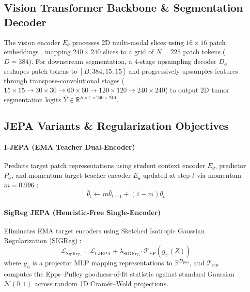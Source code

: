 \documentclass{article}
\begin{document}
\subsection{Vision Transformer Backbone \& Segmentation Decoder}
The vision encoder $E_\theta$ processes 2D multi-modal slices using $16 \times 16$ patch embeddings \citep{hatamizadeh2022swin}, mapping $240 \times 240$ slices to a grid of $N = 225$ patch tokens ($D = 384$). For downstream segmentation, a 4-stage upsampling decoder $D_\phi$ reshapes patch tokens to $[B, 384, 15, 15]$ and progressively upsamples features through transpose-convolutional stages ($15\times15 \rightarrow 30\times30 \rightarrow 60\times60 \rightarrow 120\times120 \rightarrow 240\times240$) to output 2D tumor segmentation logits $\hat{Y} \in \mathbb{R}^{B \times 1 \times 240 \times 240}$.

\subsection{JEPA Variants \& Regularization Objectives}

\paragraph{I-JEPA (EMA Teacher Dual-Encoder)}
Predicts target patch representations using student context encoder $E_\theta$, predictor $P_\phi$, and momentum target teacher encoder $E_{\bar{\theta}}$ updated at step $t$ via momentum $m = 0.996$ \citep{assran2023ijepa}:
\begin{equation}
    \bar{\theta}_t \leftarrow m \bar{\theta}_{t-1} + (1 - m) \theta_t
\end{equation}

\paragraph{SigReg JEPA (Heuristic-Free Single-Encoder)}
Eliminates EMA target encoders using Sketched Isotropic Gaussian Regularization (SIGReg) \citep{balestriero2025lejepa}:
\begin{equation}
    \mathcal{L}_{\text{SigReg}} = \mathcal{L}_{\text{I-JEPA}} + \lambda_{\text{SIGReg}} \cdot \mathcal{T}_{\text{EP}}(g_\psi(Z))
\end{equation}
where $g_\psi$ is a projector MLP mapping representations to $\mathbb{R}^{D_{\text{proj}}}$, and $\mathcal{T}_{\text{EP}}$ computes the Epps--Pulley goodness-of-fit statistic against standard Gaussian $\mathcal{N}(0, 1)$ across random 1D Cram\'er--Wold projections.
\end{document}
